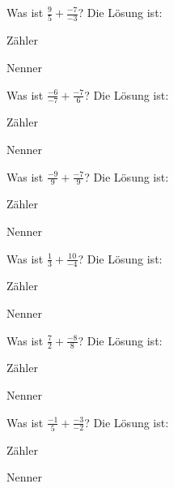 \documentclass{ximera}
\begin{document}
\begin{shuffle}
    


\begin{question}
Was ist $\frac{9}{5} + \frac{-7}{-3}$?
Die Lösung ist:
\begin{solution}
Zähler 
\end{solution}
\begin{solution}
Nenner 
\end{solution}
\end{question}


\begin{question}
Was ist $\frac{-6}{-7} + \frac{-7}{6}$?
Die Lösung ist:
\begin{solution}
Zähler 
\end{solution}
\begin{solution}
Nenner 
\end{solution}
\end{question}


\begin{question}
Was ist $\frac{-9}{9} + \frac{-7}{9}$?
Die Lösung ist:
\begin{solution}
Zähler 
\end{solution}
\begin{solution}
Nenner 
\end{solution}
\end{question}


\begin{question}
Was ist $\frac{1}{3} + \frac{10}{-4}$?
Die Lösung ist:
\begin{solution}
Zähler 
\end{solution}
\begin{solution}
Nenner 
\end{solution}
\end{question}


\begin{question}
Was ist $\frac{7}{2} + \frac{-8}{8}$?
Die Lösung ist:
\begin{solution}
Zähler 
\end{solution}
\begin{solution}
Nenner 
\end{solution}
\end{question}


\begin{question}
Was ist $\frac{-1}{5} + \frac{-3}{-2}$?
Die Lösung ist:
\begin{solution}
Zähler 
\end{solution}
\begin{solution}
Nenner 
\end{solution}
\end{question}



\end{shuffle}
\end{document}

